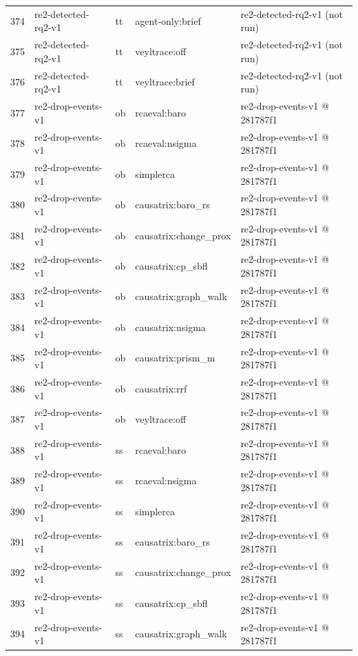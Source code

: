 \begin{longtable}{@{}r>{\raggedright\arraybackslash}p{87.0pt}>{\raggedright\arraybackslash}p{18.0pt}>{\raggedright\arraybackslash}p{63.0pt}>{\raggedright\arraybackslash}p{108.0pt}@{}}
374 & re2-detected-rq2-v1 & tt & agent-only:brief & re2-detected-rq2-v1 (not run) \\
375 & re2-detected-rq2-v1 & tt & veyltrace:off & re2-detected-rq2-v1 (not run) \\
376 & re2-detected-rq2-v1 & tt & veyltrace:brief & re2-detected-rq2-v1 (not run) \\
377 & re2-drop-events-v1 & ob & rcaeval:baro & re2-drop-events-v1 @ 281787f1 \\
378 & re2-drop-events-v1 & ob & rcaeval:nsigma & re2-drop-events-v1 @ 281787f1 \\
379 & re2-drop-events-v1 & ob & simplerca & re2-drop-events-v1 @ 281787f1 \\
380 & re2-drop-events-v1 & ob & causatrix:baro\_rs & re2-drop-events-v1 @ 281787f1 \\
381 & re2-drop-events-v1 & ob & causatrix:change\_prox & re2-drop-events-v1 @ 281787f1 \\
382 & re2-drop-events-v1 & ob & causatrix:cp\_sbfl & re2-drop-events-v1 @ 281787f1 \\
383 & re2-drop-events-v1 & ob & causatrix:graph\_walk & re2-drop-events-v1 @ 281787f1 \\
384 & re2-drop-events-v1 & ob & causatrix:nsigma & re2-drop-events-v1 @ 281787f1 \\
385 & re2-drop-events-v1 & ob & causatrix:prism\_m & re2-drop-events-v1 @ 281787f1 \\
386 & re2-drop-events-v1 & ob & causatrix:rrf & re2-drop-events-v1 @ 281787f1 \\
387 & re2-drop-events-v1 & ob & veyltrace:off & re2-drop-events-v1 @ 281787f1 \\
388 & re2-drop-events-v1 & ss & rcaeval:baro & re2-drop-events-v1 @ 281787f1 \\
389 & re2-drop-events-v1 & ss & rcaeval:nsigma & re2-drop-events-v1 @ 281787f1 \\
390 & re2-drop-events-v1 & ss & simplerca & re2-drop-events-v1 @ 281787f1 \\
391 & re2-drop-events-v1 & ss & causatrix:baro\_rs & re2-drop-events-v1 @ 281787f1 \\
392 & re2-drop-events-v1 & ss & causatrix:change\_prox & re2-drop-events-v1 @ 281787f1 \\
393 & re2-drop-events-v1 & ss & causatrix:cp\_sbfl & re2-drop-events-v1 @ 281787f1 \\
394 & re2-drop-events-v1 & ss & causatrix:graph\_walk & re2-drop-events-v1 @ 281787f1 \\

\end{longtable}
